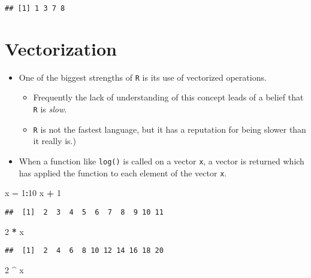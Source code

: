\documentclass[]{book}
\newenvironment{Shaded}{\begin{snugshade}}{\end{snugshade}}
\newcommand{\DecValTok}[1]{\textcolor[rgb]{0.00,0.00,0.81}{#1}}
\newcommand{\NormalTok}[1]{#1}
\newcommand{\OperatorTok}[1]{\textcolor[rgb]{0.81,0.36,0.00}{\textbf{#1}}}
\newcommand{\StringTok}[1]{\textcolor[rgb]{0.31,0.60,0.02}{#1}}
\providecommand{\tightlist}{%
  \setlength{\itemsep}{0pt}\setlength{\parskip}{0pt}}
\begin{document}
\begin{verbatim}
## [1] 1 3 7 8
\end{verbatim}

\hypertarget{vectorization}{%
\section{Vectorization}\label{vectorization}}

\begin{itemize}
\tightlist
\item
  One of the biggest strengths of \texttt{R} is its use of vectorized operations.

  \begin{itemize}
  \tightlist
  \item
    Frequently the lack of understanding of this concept leads of a belief that \texttt{R} is \emph{slow}.
  \item
    \texttt{R} is not the fastest language, but it has a reputation for being slower than it really is.)
  \end{itemize}
\item
  When a function like \texttt{log()} is called on a vector \texttt{x}, a vector is returned which has applied the function to each element of the vector \texttt{x}.
\end{itemize}

\begin{Shaded}
\begin{Highlighting}[]
\NormalTok{x =}\StringTok{ }\DecValTok{1}\OperatorTok{:}\DecValTok{10}
\NormalTok{x }\OperatorTok{+}\StringTok{ }\DecValTok{1}
\end{Highlighting}
\end{Shaded}

\begin{verbatim}
##  [1]  2  3  4  5  6  7  8  9 10 11
\end{verbatim}

\begin{Shaded}
\begin{Highlighting}[]
\DecValTok{2} \OperatorTok{*}\StringTok{ }\NormalTok{x}
\end{Highlighting}
\end{Shaded}

\begin{verbatim}
##  [1]  2  4  6  8 10 12 14 16 18 20
\end{verbatim}

\begin{Shaded}
\begin{Highlighting}[]
\DecValTok{2} \OperatorTok{^}\StringTok{ }\NormalTok{x}
\end{Highlighting}
\end{Shaded}
\end{document}
